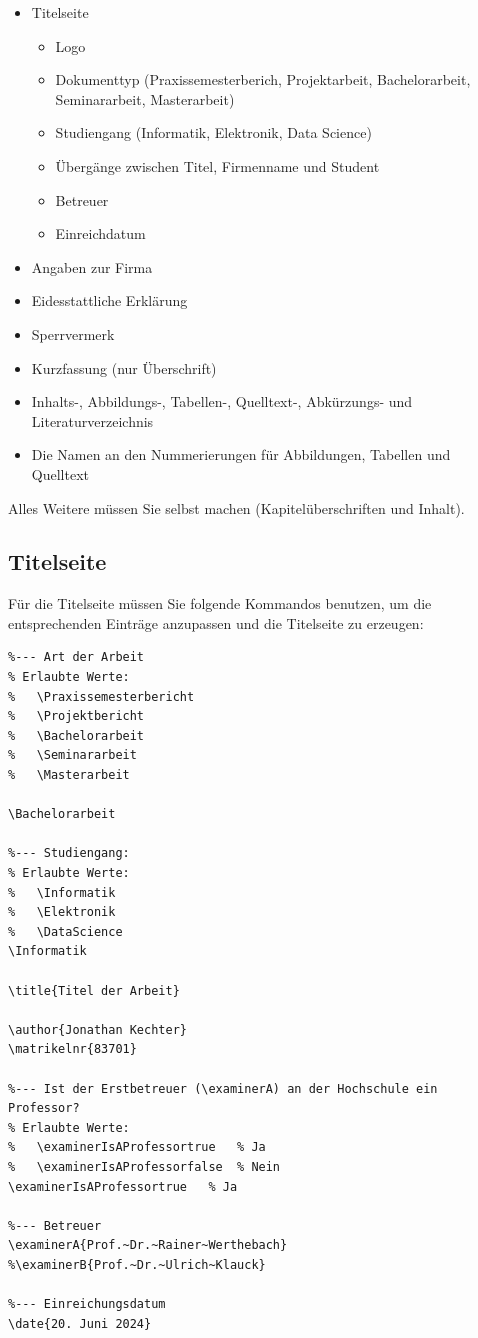 \documentclass[pdftex,a4paper]{scrartcl}
\begin{document}
\begin{itemize}
  \item Titelseite
  \begin{itemize}
    \item Logo
    \item Dokumenttyp (Praxissemesterberich, Projektarbeit, Bachelorarbeit, Seminararbeit, Masterarbeit)
    \item Studiengang (Informatik, Elektronik, Data Science)
    \item Übergänge zwischen Titel, Firmenname und Student
    \item Betreuer
    \item Einreichdatum
  \end{itemize}
  \item Angaben zur Firma
  \item Eidesstattliche Erklärung
  \item Sperrvermerk
  \item Kurzfassung (nur Überschrift)
  \item Inhalts-, Abbildungs-, Tabellen-, Quelltext-, Abkürzungs- und Literaturverzeichnis
  \item Die Namen an den Nummerierungen für Abbildungen, Tabellen und Quelltext
\end{itemize}

Alles Weitere müssen Sie selbst machen (Kapitelüberschriften und Inhalt).
 
\subsection{Titelseite}
\label{sec:titleseite}
Für die Titelseite müssen Sie folgende Kommandos benutzen, um die entsprechenden
Einträge anzupassen und die Titelseite zu erzeugen:

\begin{verbatim}
%--- Art der Arbeit
% Erlaubte Werte:
%   \Praxissemesterbericht
%   \Projektbericht
%   \Bachelorarbeit
%   \Seminararbeit
%   \Masterarbeit

\Bachelorarbeit

%--- Studiengang:
% Erlaubte Werte:
%   \Informatik
%   \Elektronik
%   \DataScience
\Informatik

\title{Titel der Arbeit}

\author{Jonathan Kechter}
\matrikelnr{83701}

%--- Ist der Erstbetreuer (\examinerA) an der Hochschule ein Professor?
% Erlaubte Werte:
%   \examinerIsAProfessortrue   % Ja
%   \examinerIsAProfessorfalse  % Nein
\examinerIsAProfessortrue   % Ja

%--- Betreuer
\examinerA{Prof.~Dr.~Rainer~Werthebach}
%\examinerB{Prof.~Dr.~Ulrich~Klauck}

%--- Einreichungsdatum
\date{20. Juni 2024}
\end{verbatim}
\end{document}
